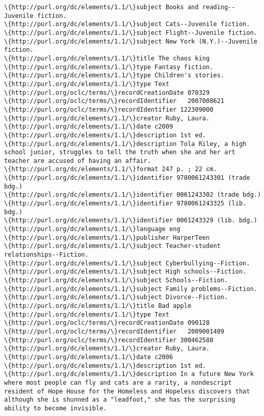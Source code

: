 \documentclass[11pt]{article}
\begin{document}
\begin{Verbatim}[commandchars=\\\{\}]
\{http://purl.org/dc/elements/1.1/\}subject Books and reading--Juvenile fiction.
\{http://purl.org/dc/elements/1.1/\}subject Cats--Juvenile fiction.
\{http://purl.org/dc/elements/1.1/\}subject Flight--Juvenile fiction.
\{http://purl.org/dc/elements/1.1/\}subject New York (N.Y.)--Juvenile fiction.
\{http://purl.org/dc/elements/1.1/\}title The chaos king 
\{http://purl.org/dc/elements/1.1/\}type Fantasy fiction.
\{http://purl.org/dc/elements/1.1/\}type Children's stories.
\{http://purl.org/dc/elements/1.1/\}type Text
\{http://purl.org/oclc/terms/\}recordCreationDate 070329
\{http://purl.org/oclc/terms/\}recordIdentifier   2007008621
\{http://purl.org/oclc/terms/\}recordIdentifier 122309000
\{http://purl.org/dc/elements/1.1/\}creator Ruby, Laura.
\{http://purl.org/dc/elements/1.1/\}date c2009
\{http://purl.org/dc/elements/1.1/\}description 1st ed.
\{http://purl.org/dc/elements/1.1/\}description Tola Riley, a high school junior, struggles to tell the truth when she and her art teacher are accused of having an affair.
\{http://purl.org/dc/elements/1.1/\}format 247 p. ; 22 cm.
\{http://purl.org/dc/elements/1.1/\}identifier 9780061243301 (trade bdg.)
\{http://purl.org/dc/elements/1.1/\}identifier 0061243302 (trade bdg.)
\{http://purl.org/dc/elements/1.1/\}identifier 9780061243325 (lib. bdg.)
\{http://purl.org/dc/elements/1.1/\}identifier 0061243329 (lib. bdg.)
\{http://purl.org/dc/elements/1.1/\}language eng
\{http://purl.org/dc/elements/1.1/\}publisher HarperTeen
\{http://purl.org/dc/elements/1.1/\}subject Teacher-student relationships--Fiction.
\{http://purl.org/dc/elements/1.1/\}subject Cyberbullying--Fiction.
\{http://purl.org/dc/elements/1.1/\}subject High schools--Fiction.
\{http://purl.org/dc/elements/1.1/\}subject Schools--Fiction.
\{http://purl.org/dc/elements/1.1/\}subject Family problems--Fiction.
\{http://purl.org/dc/elements/1.1/\}subject Divorce--Fiction.
\{http://purl.org/dc/elements/1.1/\}title Bad apple 
\{http://purl.org/dc/elements/1.1/\}type Text
\{http://purl.org/oclc/terms/\}recordCreationDate 090128
\{http://purl.org/oclc/terms/\}recordIdentifier   2009001409
\{http://purl.org/oclc/terms/\}recordIdentifier 300462588
\{http://purl.org/dc/elements/1.1/\}creator Ruby, Laura.
\{http://purl.org/dc/elements/1.1/\}date c2006
\{http://purl.org/dc/elements/1.1/\}description 1st ed.
\{http://purl.org/dc/elements/1.1/\}description In a future New York where most people can fly and cats are a rarity, a nondescript resident of Hope House for the Homeless and Hopeless discovers that although she is shunned as a "leadfoot," she has the surprising ability to become invisible.

\end{Verbatim}
\end{document}
